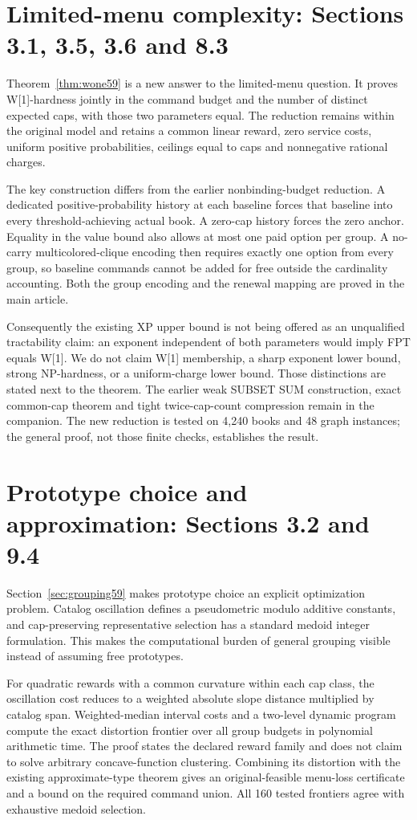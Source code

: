 \section{Limited-menu complexity: Sections 3.1, 3.5, 3.6 and 8.3}
Theorem~\ref{thm:wone59} is a new answer to the limited-menu question. It proves W[1]-hardness jointly in the command budget and the number of distinct expected caps, with those two parameters equal. The reduction remains within the original model and retains a common linear reward, zero service costs, uniform positive probabilities, ceilings equal to caps and nonnegative rational charges.

The key construction differs from the earlier nonbinding-budget reduction. A dedicated positive-probability history at each baseline forces that baseline into every threshold-achieving actual book. A zero-cap history forces the zero anchor. Equality in the value bound also allows at most one paid option per group. A no-carry multicolored-clique encoding then requires exactly one option from every group, so baseline commands cannot be added for free outside the cardinality accounting. Both the group encoding and the renewal mapping are proved in the main article.

Consequently the existing XP upper bound is not being offered as an unqualified tractability claim: an exponent independent of both parameters would imply FPT equals W[1]. We do not claim W[1] membership, a sharp exponent lower bound, strong NP-hardness, or a uniform-charge lower bound. Those distinctions are stated next to the theorem. The earlier weak SUBSET SUM construction, exact common-cap theorem and tight twice-cap-count compression remain in the companion. The new reduction is tested on 4,240 books and 48 graph instances; the general proof, not those finite checks, establishes the result.

\section{Prototype choice and approximation: Sections 3.2 and 9.4}
Section~\ref{sec:grouping59} makes prototype choice an explicit optimization problem. Catalog oscillation defines a pseudometric modulo additive constants, and cap-preserving representative selection has a standard medoid integer formulation. This makes the computational burden of general grouping visible instead of assuming free prototypes.

For quadratic rewards with a common curvature within each cap class, the oscillation cost reduces to a weighted absolute slope distance multiplied by catalog span. Weighted-median interval costs and a two-level dynamic program compute the exact distortion frontier over all group budgets in polynomial arithmetic time. The proof states the declared reward family and does not claim to solve arbitrary concave-function clustering. Combining its distortion with the existing approximate-type theorem gives an original-feasible menu-loss certificate and a bound on the required command union. All 160 tested frontiers agree with exhaustive medoid selection.

